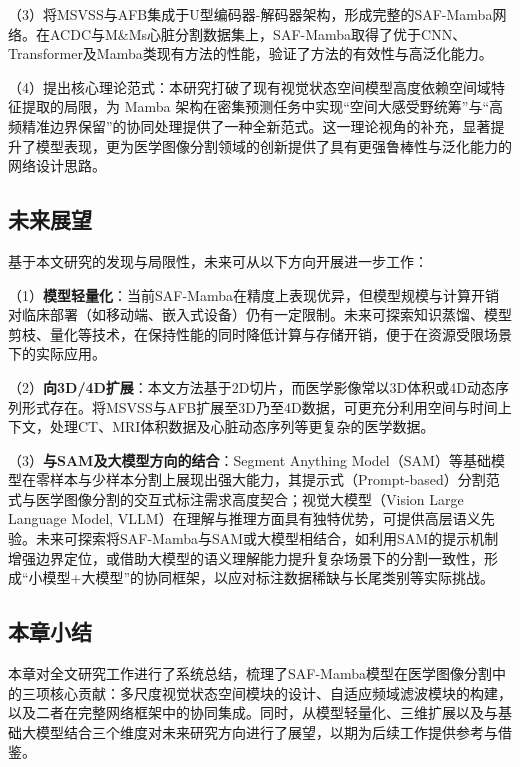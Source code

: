 \documentclass[12pt, a4paper, twoside]{article}
\begin{document}
（3）将MSVSS与AFB集成于U型编码器-解码器架构，形成完整的SAF-Mamba网络。在ACDC与M\&Ms心脏分割数据集上，SAF-Mamba取得了优于CNN、Transformer及Mamba类现有方法的性能，验证了方法的有效性与高泛化能力。

（4）提出核心理论范式：本研究打破了现有视觉状态空间模型高度依赖空间域特征提取的局限，为 Mamba 架构在密集预测任务中实现“空间大感受野统筹”与“高频精准边界保留”的协同处理提供了一种全新范式。这一理论视角的补充，显著提升了模型表现，更为医学图像分割领域的创新提供了具有更强鲁棒性与泛化能力的网络设计思路。

\subsection{未来展望}

基于本文研究的发现与局限性，未来可从以下方向开展进一步工作：

（1）\textbf{模型轻量化}：当前SAF-Mamba在精度上表现优异，但模型规模与计算开销对临床部署（如移动端、嵌入式设备）仍有一定限制。未来可探索知识蒸馏、模型剪枝、量化等技术，在保持性能的同时降低计算与存储开销，便于在资源受限场景下的实际应用。

（2）\textbf{向3D/4D扩展}：本文方法基于2D切片，而医学影像常以3D体积或4D动态序列形式存在。将MSVSS与AFB扩展至3D乃至4D数据，可更充分利用空间与时间上下文，处理CT、MRI体积数据及心脏动态序列等更复杂的医学数据。

（3）\textbf{与SAM及大模型方向的结合}：Segment Anything Model（SAM）等基础模型在零样本与少样本分割上展现出强大能力，其提示式（Prompt-based）分割范式与医学图像分割的交互式标注需求高度契合；视觉大模型（Vision Large Language Model, VLLM）在理解与推理方面具有独特优势，可提供高层语义先验。未来可探索将SAF-Mamba与SAM或大模型相结合，如利用SAM的提示机制增强边界定位，或借助大模型的语义理解能力提升复杂场景下的分割一致性，形成“小模型+大模型”的协同框架，以应对标注数据稀缺与长尾类别等实际挑战。

\subsection{本章小结}

本章对全文研究工作进行了系统总结，梳理了SAF-Mamba模型在医学图像分割中的三项核心贡献：多尺度视觉状态空间模块的设计、自适应频域滤波模块的构建，以及二者在完整网络框架中的协同集成。同时，从模型轻量化、三维扩展以及与基础大模型结合三个维度对未来研究方向进行了展望，以期为后续工作提供参考与借鉴。

\end{document}
